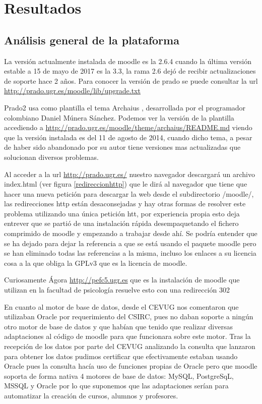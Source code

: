 \chapter{Resultados}

\section{Análisis general de la plataforma}

La versión actualmente instalada de moodle es la 2.6.4 cuando la última versión estable a 15 de mayo de 2017 es la 3.3, la rama 2.6 dejó de recibir actualizaciones de soporte hace 2 años. Para conocer la versión de prado se puede consultar la url \url{http://prado.ugr.es/moodle/lib/upgrade.txt}

Prado2 usa como plantilla el tema Archaius \cite{moodletheme}, desarrollada por el programador colombiano Daniel Múnera Sánchez. Podemos ver la versión de la plantilla accediendo a \url{http://prado.ugr.es/moodle/theme/archaius/README.md} viendo que la versión instalada es del 11 de agosto de 2014, cuando dicho tema, a pesar de haber sido abandonado por su autor tiene versiones mas actualizadas que solucionan diversos problemas.

Al acceder a la url \url{http://prado.ugr.es/} nuestro navegador descargará un archivo index.html (ver figura \ref{redireccionhttp}) que le dirá al navegador que tiene que hacer una nueva petición para descargar la web desde el subdirectorio /moodle/, las redirecciones http están desaconsejadas y hay otras formas de resolver este problema utilizando una única petición htt, por experiencia propia esto deja entrever que se partió de una instalación rápida desempaquetando el fichero comprimido de moodle y empezando a trabajar desde ahí. Se podría entender que se ha dejado para dejar la referencia a que se está usando el paquete moodle pero se han eliminado todas las referencias a la misma, incluso los enlaces a su licencia cosa a la que obliga la GPLv3 que es la licencia de moodle.

Curiosamente Ágora \url{http://pefc5.ugr.es} que es la instalación de moodle que utilizan en la facultad de psicología resuelve esto con una redirección 302

En cuanto al motor de base de datos, desde el CEVUG nos comentaron que utilizaban Oracle por requerimiento del CSIRC, pues no daban soporte a ningún otro motor de base de datos y que habían que tenido que realizar diversas adaptaciones al código de moodle para que funcionara sobre este motor. Tras la recepción de los datos por parte del CEVUG analizando la consulta que lanzaron para obtener los datos pudimos certificar que efectivamente estaban usando Oracle pues la consulta hacía uso de funciones propias de Oracle pero que moodle soporta de forma nativa 4 motores de base de datos: MySQL, PostgreSqL, MSSQL y Oracle por lo que suponemos que las adaptaciones serían para automatizar la creación de cursos, alumnos y profesores.  


